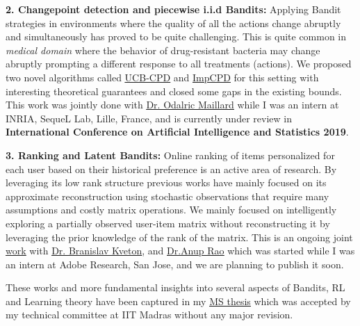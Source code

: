 \documentclass{article}
\begin{document}
\textbf{2. Changepoint detection and piecewise i.i.d Bandits:}  Applying Bandit strategies in environments where the quality of all the actions change abruptly and simultaneously has proved to be quite challenging. This is quite common in \textit{medical domain} where the behavior of drug-resistant bacteria may change abruptly prompting a different response to all treatments (actions). We proposed two novel algorithms called \href{https://subhojyoti.github.io/pdf/aistats_2019.pdf}{\underline{\color{blue}UCB-CPD}} and \href{https://subhojyoti.github.io/pdf/aistats_2019.pdf}{\underline{\color{blue}ImpCPD}} for this setting with interesting theoretical guarantees and closed some gaps in the existing bounds. This work was jointly done with \href{https://scholar.google.com/citations?user=7EweMdoAAAAJ&hl=en}{\underline{\color{red}Dr. Odalric Maillard}} while I was an intern at INRIA, SequeL Lab, Lille, France, and is currently under review in \textbf{International Conference on Artificial Intelligence and Statistics 2019}. 


\textbf{3. Ranking and Latent Bandits:} Online ranking of items personalized for each user based on their historical preference is an active area of research. By leveraging its low rank structure previous works have mainly focused on its approximate reconstruction using stochastic observations that require many assumptions and costly matrix operations. We mainly focused on intelligently exploring a partially observed user-item matrix without reconstructing it by leveraging the prior knowledge of the rank of the matrix. This is an ongoing joint \href{https://subhojyoti.github.io/pdf/paper.pdf}{\underline{\color{blue} work}} with \href{http://www.bkveton.com/}{\underline{\color{red}Dr. Branislav Kveton}}, and \href{https://sites.google.com/site/anupraob/}{\underline{\color{red}Dr.Anup Rao}}  which was started while I was an intern at Adobe Research, San Jose, and we are planning to publish it soon.

These works and more fundamental insights into several aspects of Bandits, RL and Learning theory have been captured in my \href{https://www.cse.iitm.ac.in/~ravi/papers/Subhojyoti_thesis.pdf}{\underline{\color{blue}MS thesis}} which was accepted by my technical committee at IIT Madras without any major revision.
	 
\end{document}
